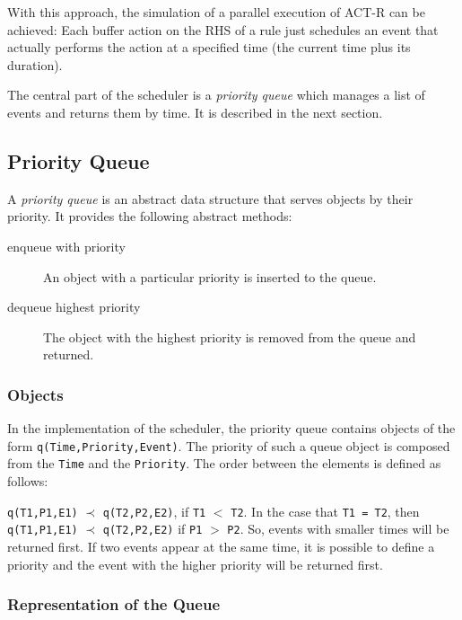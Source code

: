With this approach, the simulation of a parallel execution of ACT-R can be achieved: Each buffer action on the RHS of a rule just schedules an event that actually performs the action at a specified time (the current time plus its duration). 

The central part of the scheduler is a \emph{priority queue} which manages a list of events and returns them by time. It is described in the next section.

\subsection{Priority Queue}

A \emph{priority queue} is an abstract data structure that serves objects by their priority. It provides the following abstract methods:

\begin{description}
 \item[enqueue with priority] An object with a particular priority is inserted to the queue. 
 \item[dequeue highest priority] The object with the highest priority is removed from the queue and returned.
\end{description}

\subsubsection{Objects}

In the implementation of the scheduler, the priority queue contains objects of the form \verb|q(Time,Priority,Event)|. The priority of such a queue object is composed from the \verb|Time| and the \verb|Priority|. The order between the elements is defined as follows:

\begin{definition}
\verb|q(T1,P1,E1)| $\prec$ \verb|q(T2,P2,E2)|, if \verb|T1| $<$ \verb|T2|. In the case that \verb|T1 = T2|, then \verb|q(T1,P1,E1)| $\prec$ \verb|q(T2,P2,E2)| if \verb|P1| $>$ \verb|P2|. So, events with smaller times will be returned first. If two events appear at the same time, it is possible to define a priority and the event with the higher priority will be returned first. 
\end{definition}

\subsubsection{Representation of the Queue}

